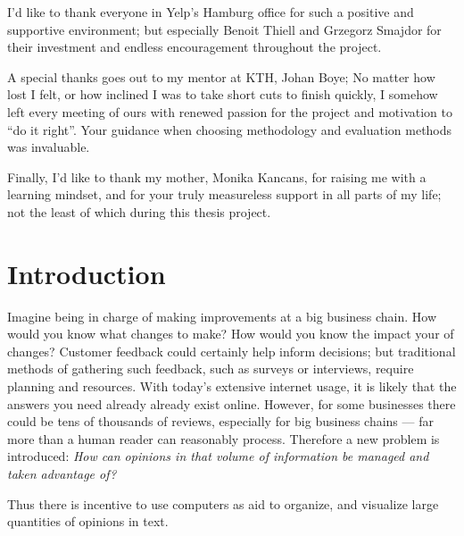 \documentclass[a4paper,11pt]{kth-mag}
\begin{document}
I'd like to thank everyone in Yelp's Hamburg office for such a positive and supportive environment; but especially
Benoit Thiell and Grzegorz Smajdor for their investment and endless encouragement throughout the project.

A special thanks goes out to my mentor at KTH, Johan Boye; No matter how lost I felt, or how inclined I was to
take short cuts to finish quickly, I somehow left every meeting of ours with renewed passion for the project
and motivation to ``do it right''. Your guidance when choosing methodology and evaluation methods was invaluable.

Finally, I'd like to thank my mother, Monika Kancans, for raising me with a learning mindset,
and for your truly measureless support in all parts of my life; not the least of which during this thesis project.


\clearpage

\tableofcontents*


\mainmatter
\pagestyle{newchap}
\chapter{Introduction}
Imagine being in charge of making improvements at a big business chain.
How would you know what changes to make? How would you know the impact your of changes?
Customer feedback could certainly help inform decisions; but traditional methods of gathering such feedback,
such as surveys or interviews, require planning and resources.
With today's extensive internet usage, it is likely that the answers you need already
already exist online. However, for some businesses there could be tens of thousands of reviews, especially for big
business chains --- far more than a human reader can reasonably process. Therefore a new problem is introduced:
\emph{How can opinions in that volume of information be managed and taken advantage of?}

Thus there is incentive to use computers as aid to organize, and visualize large quantities of opinions in text.
\end{document}
